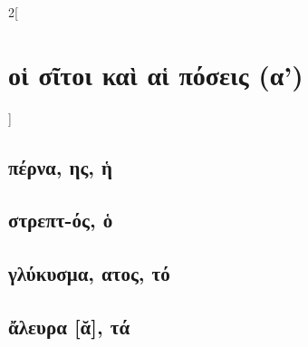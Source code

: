 \documentclass{book}
\begin{document}
\begin{multicols}{2}[\section{οἱ σῖτοι καὶ αἱ πόσεις (α')}]
\subsection{πέρνα, ης, ἡ}
\subsection{στρεπτ-ός, ὁ}
\subsection{γλύκυσμα, ατος, τό}
\subsection{ἄλευρα [ᾰ], τά}
~
\end{multicols}
\newpage  
\end{document}

